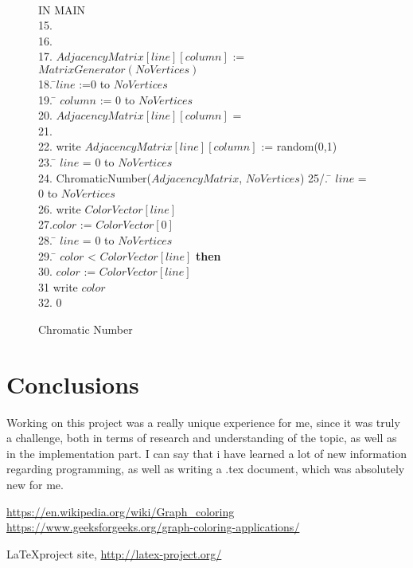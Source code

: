 \documentclass{article}
\begin{document}
\begin{figure}
\begin{center}
\begin{tabbing}
\\IN MAIN\\
15.\\
16.   \\
17. \indent$AdjacencyMatrix[line][column]$ := $MatrixGenerator(NoVertices)$ \\
18.  \=$line$ :=0 to $NoVertices$ \\
19. \indent {} \= $column$ := 0 to $NoVertices$\\
20. \indent \>\> $AdjacencyMatrix[line][column]$ = \\
21. \indent \>\>\>   \\
22. \indent  \>\>\> write $AdjacencyMatrix[line][column]$ := random(0,1)\\
23.  \= $line$ = 0 to $NoVertices$ \\
24. \indent \> ChromaticNumber($AdjacencyMatrix$, $NoVertices$)
25/. \indent{\bf} \= $line$ = 0 to $NoVertices$ \\
26. \indent\> write $ColorVector[line]$\\
27.\indent $color$ := $ColorVector[0]$\\
28.  \= $line$ = 0 to $NoVertices$ \\
29. \indent{} \= $color$ < $ColorVector[line]$ {\bf then}\\
30. \indent\>\> $color$ := $ColorVector[line]$\\
31 \indent write $color$\\
32.  0\\
\end{tabbing}
\caption{Chromatic Number}
\label{fig_1}
\end{center}
\end{figure}

\newpage
\pagebrake

\section{Conclusions}
Working on this project was a really unique experience for me, since it was truly a challenge, both in terms of research and understanding of the topic, as well as in the implementation part. I can say that i have learned a lot of new information regarding programming, as well as writing a .tex document, which was absolutely new for me.


\linebreak
\pagebrake

\begin{thebibliography}{9}
\label{sec_ref}

	\url{https://en.wikipedia.org/wiki/Graph_coloring}\\
	\url{https://www.geeksforgeeks.org/graph-coloring-applications/}


     \LaTeX project site,
     \url{http://latex-project.org/}

\end{thebibliography}
\end{document}
